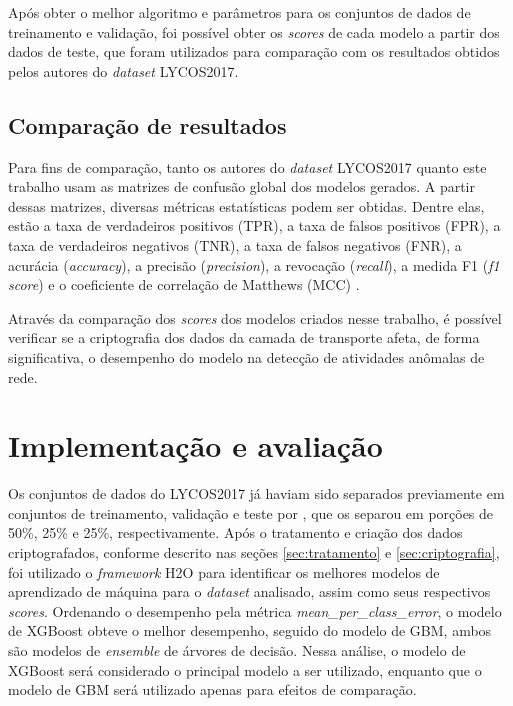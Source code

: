 \documentclass[12pt]{article}
\begin{document}
Após obter o melhor algoritmo e parâmetros para os conjuntos de dados de treinamento e validação, foi possível obter os \emph{scores} de cada modelo a partir dos dados de teste, que foram utilizados para comparação com os resultados obtidos pelos autores do \emph{dataset} LYCOS2017.

\subsection{Comparação de resultados}
\label{sec:comparacao}

Para fins de comparação, tanto os autores do \emph{dataset} LYCOS2017 quanto este trabalho usam as matrizes de confusão global dos modelos gerados. A partir dessas matrizes, diversas métricas estatísticas podem ser obtidas. Dentre elas, estão a taxa de verdadeiros positivos (TPR), a taxa de falsos positivos (FPR), a taxa de verdadeiros negativos (TNR), a taxa de falsos negativos (FNR), a acurácia  (\emph{accuracy}), a precisão (\emph{precision}), a revocação (\emph{recall}), a medida F1 (\emph{f1 score}) e o coeficiente de correlação de Matthews (MCC) \cite{h2oai}.

Através da comparação dos \emph{scores} dos modelos criados nesse trabalho, é possível verificar se a criptografia dos dados da camada de transporte afeta, de forma significativa, o desempenho do modelo na detecção de atividades anômalas de rede.

\section{Implementação e avaliação}
\label{cap:implementacao}

Os conjuntos de dados do LYCOS2017 já haviam sido separados previamente em conjuntos de treinamento, validação e teste por \cite{rosay2021cic}, que os separou em porções de 50\%, 25\% e 25\%, respectivamente. Após o tratamento e criação dos dados criptografados, conforme descrito nas seções \ref{sec:tratamento} e \ref{sec:criptografia}, foi utilizado o \emph{framework} H2O para identificar os melhores modelos de aprendizado de máquina para o \emph{dataset} analisado, assim como seus respectivos \emph{scores}. Ordenando o desempenho pela métrica \emph{mean\_per\_class\_error}, o modelo de XGBoost obteve o melhor desempenho, seguido do modelo de GBM, ambos são modelos de \emph{ensemble} de árvores de decisão. Nessa análise, o modelo de XGBoost será considerado o principal modelo a ser utilizado, enquanto que o modelo de GBM será utilizado apenas para efeitos de comparação.
\end{document}
